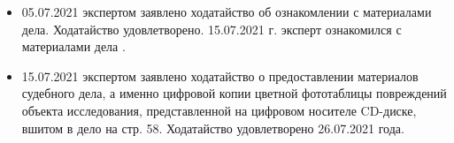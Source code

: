 \begin{itemize}
	\item 05.07.2021 экспертом заявлено ходатайство об ознакомлении с материалами дела. Ходатайство удовлетворено. 15.07.2021 г.  эксперт ознакомился с материалами дела \delonum.
	\item 15.07.2021 экспертом заявлено ходатайство о предоставлении материалов судебного дела, а именно цифровой копии  цветной фототаблицы повреждений объекта исследования,      представленной  на цифровом носителе  CD-диске, вшитом в дело на стр. 58. Ходатайство удовлетворено 26.07.2021 года.
\end{itemize}